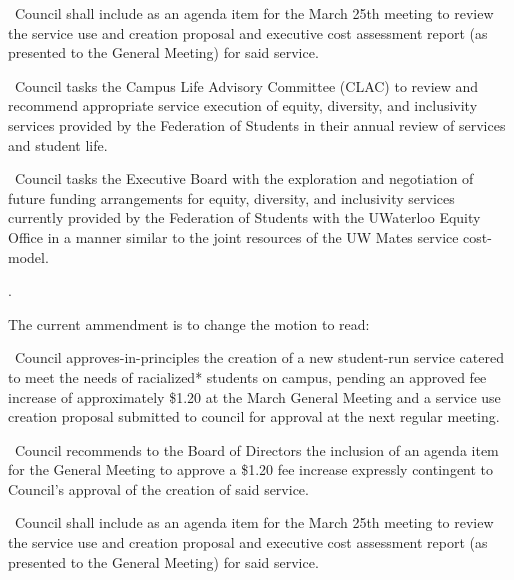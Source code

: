 \begin{motion}
\begin{motion}
\begin{motion}
\begin{motion}
                \bifrt\ Council shall include as an agenda item for the March
                25th meeting to review the service use and creation proposal
                and executive cost assessment report (as presented to the
                General Meeting) for said service.

                \bifrt\ Council tasks the Campus Life Advisory Committee (CLAC)
                to review and recommend appropriate service execution of
                equity, diversity, and inclusivity services provided by the
                Federation of Students in their annual review of services and
                student life.

                \bifrt\ Council tasks the Executive Board with the exploration
                and negotiation of future funding arrangements for equity,
                diversity, and inclusivity services currently provided by the
                Federation of Students with the UWaterloo Equity Office in a
                manner similar to the joint resources of the UW Mates service
                cost-model.

            \end{motion}
            \movers{\senecca}{\brian}

            \carries. 
        \end{motion}

        The current ammendment is to change the motion to read: 
        \begin{motion} 
            \birt\ Council approves-in-principles the creation of a new
            student-run service catered to meet the needs of racialized*
            students on campus, pending an approved fee increase of
            approximately \$1.20 at the March General Meeting and a service use
            creation proposal submitted to council for approval at the next
            regular meeting.

            \bifrt\ Council recommends to the Board of Directors the inclusion
            of an agenda item for the General Meeting to approve a \$1.20 fee
            increase expressly contingent to Council’s approval of the creation
            of said service.

            \bifrt\ Council shall include as an agenda item for the March 25th
            meeting to review the service use and creation proposal and
            executive cost assessment report (as presented to the General
            Meeting) for said service.


\end{motion}
\end{motion}
\end{motion}
